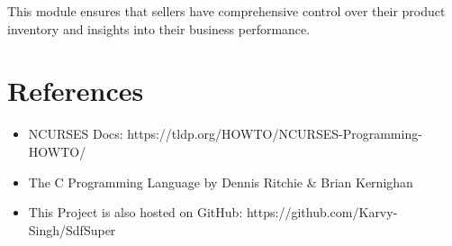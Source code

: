 \documentclass[12pt,a4paper]{article}
\begin{document}
This module ensures that sellers have comprehensive control over their product inventory and insights into their business performance.

\section{References}
\begin{itemize}
    \item NCURSES Docs: https://tldp.org/HOWTO/NCURSES-Programming-HOWTO/
    \item The C Programming Language by Dennis Ritchie \& Brian Kernighan
    \item This Project is also hosted on GitHub: https://github.com/Karvy-Singh/SdfSuper
\end{itemize}
\end{document}
